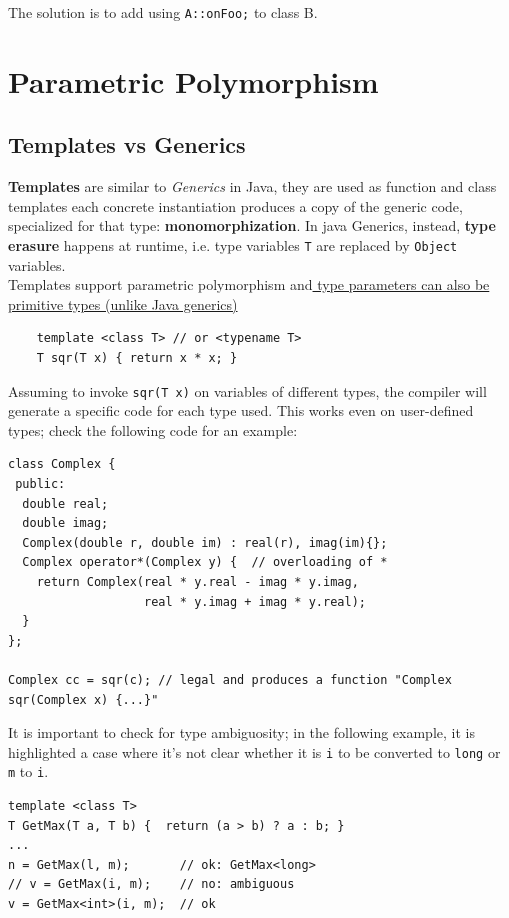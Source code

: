 The solution is to add using \lstinline|A::onFoo;| to class B.

\section{Parametric Polymorphism}
\subsection{Templates vs Generics}
\lstset{language=C++}

\textbf{Templates} are similar to \textit{Generics} in Java, 
they are used as function and class templates
each concrete instantiation produces a copy of the generic code, specialized for that type:
\textbf{monomorphization}.
In java Generics, instead, \textbf{type erasure} happens at runtime, i.e. type variables \lstinline{T} are replaced by \lstinline{Object} variables.\\
Templates support parametric polymorphism and\ul{ type parameters can also be primitive types (unlike Java generics)}
\begin{lstlisting}
    template <class T> // or <typename T>
    T sqr(T x) { return x * x; }
\end{lstlisting}
Assuming to invoke \lstinline{sqr(T x)} on variables of different types, the compiler will generate a specific code for each type used.
This works even on user-defined types;
check the following code for an example:
\begin{lstlisting}
class Complex {
 public:
  double real;
  double imag;
  Complex(double r, double im) : real(r), imag(im){};
  Complex operator*(Complex y) {  // overloading of *
    return Complex(real * y.real - imag * y.imag,
                   real * y.imag + imag * y.real);
  }
};

Complex cc = sqr(c); // legal and produces a function "Complex sqr(Complex x) {...}"
\end{lstlisting}

It is important to check for type ambiguosity;
in the following example, it is highlighted a case where it's not clear whether it is \lstinline{i} to be converted to \lstinline{long} or \lstinline{m} to \lstinline{i}.
\begin{lstlisting}
template <class T>
T GetMax(T a, T b) {  return (a > b) ? a : b; }
...
n = GetMax(l, m);       // ok: GetMax<long>
// v = GetMax(i, m);    // no: ambiguous
v = GetMax<int>(i, m);  // ok
\end{lstlisting}

